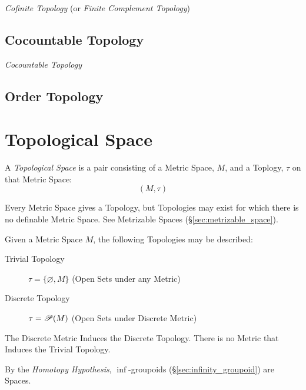 \emph{Cofinite Topology} (or \emph{Finite Complement Topology})



\subsection{Cocountable Topology}\label{sec:cocountable_topology}

\emph{Cocountable Topology}



\subsection{Order Topology}\label{sec:order_topology}



\section{Topological Space}\label{sec:topological_space}

A \emph{Topological Space} is a pair consisting of a Metric Space,
$M$, and a Toplogy, $\tau$ on that Metric Space:
\[
  (M,\tau)
\]

Every Metric Space gives a Topology, but Topologies may exist for
which there is no definable Metric Space. See Metrizable Spaces
(\S\ref{sec:metrizable_space}).

Given a Metric Space $M$, the following Topologies may be described:
\begin{description}
\item[Trivial Topology] $\tau = \{\varnothing, M\}$ (Open Sets under
  any Metric)

\item[Discrete Topology] $\tau = \mathscr{P}(M)$ (Open Sets under
  Discrete Metric)
\end{description}
The Discrete Metric Induces the Discrete Topology. There is no Metric
that Induces the Trivial Topology.

By the \emph{Homotopy Hypothesis}, $\inf$-groupoids
(\S\ref{sec:infinity_groupoid}) are Spaces.

